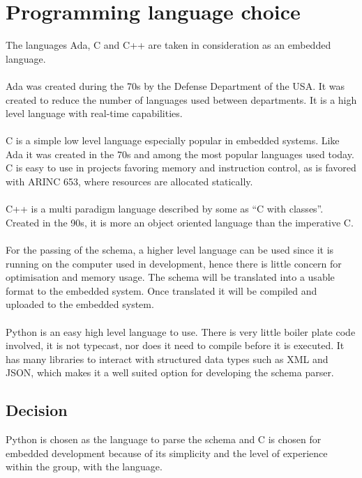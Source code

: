 \section{Programming language choice}
The languages Ada, C and C++ are taken in consideration as an embedded language.
\\\\
Ada was created during the 70\textquotesingle{}s by the Defense Department of the USA.
It was created to reduce the number of
languages used between departments.
It is a high level language with real-time capabilities.
\\\\
C is a simple low level language especially popular in embedded systems.
Like Ada it was created in the 70\textquotesingle{}s and
among the most popular languages used today.
C is easy to use in projects favoring memory and instruction control,
as is favored with ARINC 653,
where resources are allocated statically.
\\\\
C++ is a multi paradigm language described by some as ``C with classes''.
Created in the 90\textquotesingle{}s, it is more an object oriented language than
the imperative C.
\\\\
For the passing of the schema, a higher level language can be used
since it is running on the computer used in development,
hence there is little concern for optimisation and memory usage.
The schema will be translated into a usable format to the embedded system.
Once translated it will be compiled and uploaded to the
embedded system.
\\\\
Python is an easy high level language to use.
There is very little boiler plate code involved,
it is not typecast, nor does it need to compile
before it is executed.
It has many libraries to interact with structured
data types such as XML and JSON,
which makes it a well suited option for developing the schema parser.

\subsection{Decision}
Python is chosen as the language to parse the schema and
C is chosen for embedded development because of its simplicity and
the level of experience within the group, with the language.
